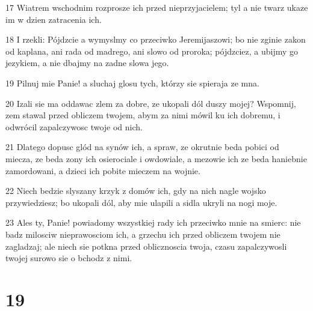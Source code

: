 \par 17 Wiatrem wschodnim rozprosze ich przed nieprzyjacielem; tyl a nie twarz ukaze im w dzien zatracenia ich.
\par 18 I rzekli: Pójdzcie a wymyslmy co przeciwko Jeremijaszowi; bo nie zginie zakon od kaplana, ani rada od madrego, ani slowo od proroka; pójdzciez, a ubijmy go jezykiem, a nie dbajmy na zadne slowa jego.
\par 19 Pilnuj mie Panie! a sluchaj glosu tych, którzy sie spieraja ze mna.
\par 20 Izali sie ma oddawac zlem za dobre, ze ukopali dól duszy mojej? Wspomnij, zem stawal przed obliczem twojem, abym za nimi mówil ku ich dobremu, i odwrócil zapalczywosc twoje od nich.
\par 21 Dlatego dopusc glód na synów ich, a spraw, ze okrutnie beda pobici od miecza, ze beda zony ich osierociale i owdowiale, a mezowie ich ze beda haniebnie zamordowani, a dzieci ich pobite mieczem na wojnie.
\par 22 Niech bedzie slyszany krzyk z domów ich, gdy na nich nagle wojsko przywiedziesz; bo ukopali dól, aby mie ulapili a sidla ukryli na nogi moje.
\par 23 Ales ty, Panie! powiadomy wszystkiej rady ich przeciwko mnie na smierc: nie badz milosciw nieprawosciom ich, a grzechu ich przed obliczem twojem nie zagladzaj; ale niech sie potkna przed oblicznoscia twoja, czasu zapalczywosli twojej surowo sie o bchodz z nimi.

\chapter{19}

